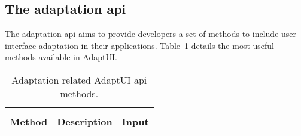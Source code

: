 \subsection{The adaptation \ac{api}}
\label{sec:adaptation_api}

The adaptation \ac{api} aims to provide developers a set of methods to include
user interface adaptation in their applications. Table~\ref{tbl:api_adaptation} 
details the most useful methods available in AdaptUI.


\begin{center}
\footnotesize
\begin{longtable}{l l l}
  \caption{Adaptation related AdaptUI \ac{api} methods.}\\
  \label{tbl:api_adaptation} \\
  \hline 
  \textbf{Method}& \textbf{Description} 	& \textbf{Input}\\
  \hline
  
  \hline
\end{longtable}
\end{center}